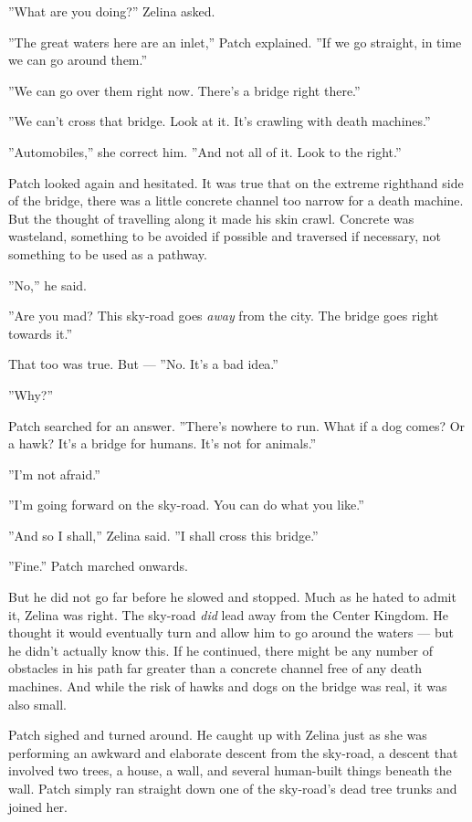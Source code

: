 \documentclass[12pt]{book}
\begin{document}
''What are you doing?'' Zelina asked.

''The great waters here are an inlet,'' Patch explained. ''If we go straight, in time we can go around them.''

''We can go over them right now. There's a bridge right there.''

''We can't cross that bridge. Look at it. It's crawling with death machines.''

''Automobiles,'' she correct him. ''And not all of it. Look to the right.''

Patch looked again and hesitated. It was true that on the extreme righthand side of the bridge, there was a little concrete channel too narrow for a death machine. But the thought of travelling along it made his skin crawl. Concrete was wasteland, something to be avoided if possible and traversed if necessary, not something to be used as a pathway.

''No,'' he said.

''Are you mad? This sky-road goes {\it away} from the city. The bridge goes right towards it.''

That too was true. But ---
''No. It's a bad idea.''

''Why?''

Patch searched for an answer. ''There's nowhere to run. What if a dog comes? Or a hawk? It's a bridge for humans. It's not for animals.''

''I'm not afraid.''

''I'm going forward on the sky-road. You can do what you like.''

''And so I shall,'' Zelina said. ''I shall cross this bridge.''

''Fine.'' Patch marched onwards.

But he did not go far before he slowed and stopped. Much as he hated to admit it, Zelina was right. The sky-road {\it did} lead away from the Center Kingdom. He thought it would eventually turn and allow him to go around the waters ---
but he didn't actually know this. If he continued, there might be any number of obstacles in his path far greater than a concrete channel free of any death machines. And while the risk of hawks and dogs on the bridge was real, it was also small.

Patch sighed and turned around. He caught up with Zelina just as she was performing an awkward and elaborate descent from the sky-road, a descent that involved two trees, a house, a wall, and several human-built things beneath the wall. Patch simply ran straight down one of the sky-road's dead tree trunks and joined her.
\end{document}
